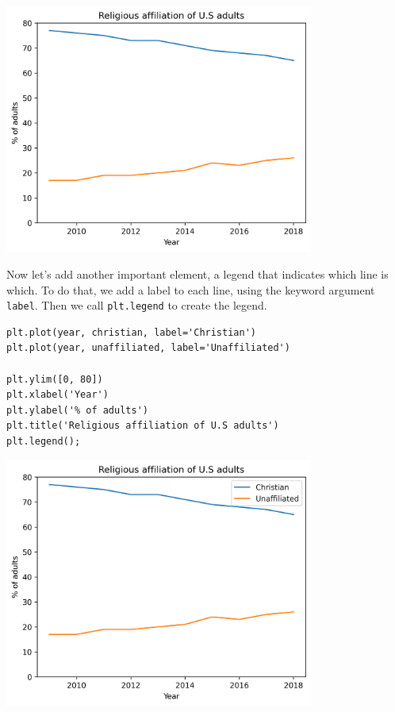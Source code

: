 \begin{center}
\includegraphics[width=4in]{chapters/06_plotting_files/06_plotting_29_0.png}
\end{center}

Now let's add another important element, a legend that indicates which
line is which. To do that, we add a label to each line, using the
keyword argument \passthrough{\lstinline!label!}. Then we call
\passthrough{\lstinline!plt.legend!} to create the legend.

\begin{lstlisting}[]
plt.plot(year, christian, label='Christian')
plt.plot(year, unaffiliated, label='Unaffiliated')

plt.ylim([0, 80])
plt.xlabel('Year')
plt.ylabel('% of adults')
plt.title('Religious affiliation of U.S adults')
plt.legend();
\end{lstlisting}

\begin{center}
\includegraphics[width=4in]{chapters/06_plotting_files/06_plotting_31_0.png}
\end{center}

